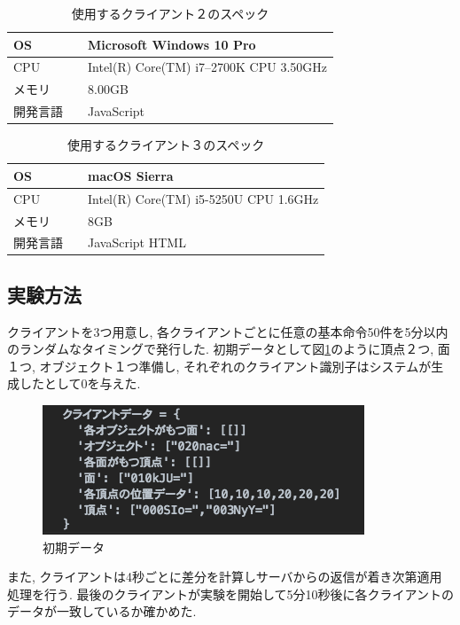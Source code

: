 \begin{table}[]
\begin{center}
	\caption{使用するクライアント２のスペック}
	\begin{tabular}{|l|l|} \hline
		OS & Microsoft Windows 10 Pro \\ \hline
		CPU & Intel(R) Core(TM) i7--2700K CPU 3.50GHz \\ \hline
		メモリ & 8.00GB \\ \hline
    開発言語　& JavaScript \\ \hline
	\end{tabular}
	\label{1_client2}
\end{center}
\end{table}
\begin{table}[]
\begin{center}
	\caption{使用するクライアント３のスペック}
	\begin{tabular}{|l|l|} \hline
		OS & macOS Sierra \\ \hline
		CPU & Intel(R) Core(TM) i5-5250U CPU 1.6GHz \\ \hline
		メモリ & 8GB \\ \hline
    開発言語　& JavaScript HTML \\ \hline
	\end{tabular}
	\label{1_client3}
\end{center}
\end{table}
\subsection{実験方法}
クライアントを3つ用意し, 各クライアントごとに任意の基本命令50件を5分以内のランダムなタイミングで発行した. 初期データとして図\ref{init}のように頂点２つ, 面１つ, オブジェクト１つ準備し, それぞれのクライアント識別子はシステムが生成したとして0を与えた.
\begin{figure}[]
 \begin{center}
	 \includegraphics[scale=0.6]{images/init}
	 \caption{初期データ}
	 \label{init}
 \end{center}
\end{figure}
また, クライアントは4秒ごとに差分を計算しサーバからの返信が着き次第適用処理を行う. 最後のクライアントが実験を開始して5分10秒後に各クライアントのデータが一致しているか確かめた.
